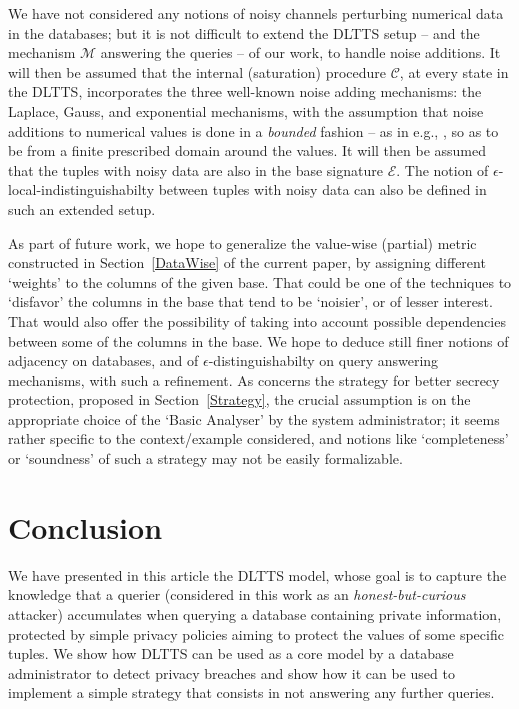 \documentclass[pdflatex]{article}
\def \C {{\mathcal{C}}}
\def \E {{\mathcal{E}}}
\def \M {{\mathcal{M}}}
\begin{document}
  We have not considered any notions of noisy channels perturbing   numerical
  data in the databases; but  it  is not difficult to extend the DLTTS setup -- and 
  the  mechanism $\M$ answering the queries -- of our work, to handle noise
  additions.  It will then be assumed  that the  internal  (saturation) procedure
  $\C$, at  every  state in  the DLTTS,  incorporates the  three well-known
  noise  adding  mechanisms:  the Laplace, Gauss, and  exponential mechanisms,  
  with the assumption that noise additions to  numerical values  is done
  in a {\em bounded} fashion -- as in e.g., \cite{BdLaplace2020}, so as to be
  from  a  finite  prescribed   domain  around the values. It will then be
  assumed  that the tuples  with noisy data are also  in  the base signature  $\E$. 
  The  notion  of $\epsilon$-local-indistinguishabilty between  tuples with
  noisy  data   can also be defined in such an extended setup. 
   
  
  As part of future work, we hope to generalize the value-wise (partial) metric
  constructed in  Section~\ref{DataWise} of the current paper, by assigning
  different `weights' to the columns of the given base. That could be one of
  the techniques to  `disfavor'  the columns in the base that tend to be
  `noisier', or of lesser interest.  That would also offer the  possibility of  taking
  into   account   possible dependencies between some of the columns in the base.
  We   hope to deduce still finer notions of adjacency on  databases,   and  of
  $\epsilon$-distinguishabilty on query answering mechanisms, with such 
  a refinement.   As concerns  the  strategy for better secrecy protection, proposed
  in  Section~\ref{Strategy}, the crucial assumption is on the appropriate choice 
  of the `Basic Analyser' by the system administrator; it seems rather specific
  to the  context/example considered, and notions  like   `completeness'   or
  `soundness'  of  such a strategy may not be easily formalizable.  

    \section{Conclusion}
    \label{Conclusion}

   We have presented in this article the DLTTS model, whose goal is to capture the knowledge
   that a querier (considered in this work as an \emph{honest-but-curious} attacker)
   accumulates when querying a database containing private information, protected by simple
   privacy policies aiming to protect the values of some specific tuples.
   We show how DLTTS can be used as a core model by a database administrator to detect
   privacy breaches and show how it can be used to implement a simple strategy that
   consists in not answering any further queries.
\end{document}
